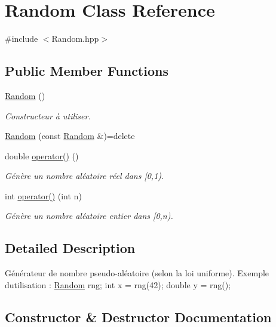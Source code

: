 \hypertarget{classRandom}{}\section{Random Class Reference}
\label{classRandom}


{\ttfamily \#include $<$Random.\+hpp$>$}

\subsection*{Public Member Functions}
\begin{DoxyCompactItemize}
\item 
\hyperlink{classRandom_acb76b49c3903a3c4fb67fd216341f08d}{Random} ()
\begin{DoxyCompactList}\small\item\em Constructeur à utiliser. \end{DoxyCompactList}\item 
\hyperlink{classRandom_a9bfadeaa4adc5ac44142d000b1c99441}{Random} (const \hyperlink{classRandom}{Random} \&)=delete
\item 
double \hyperlink{classRandom_aa0277ecffaf7d920b8ebd2399214f113}{operator()} ()
\begin{DoxyCompactList}\small\item\em Génère un nombre aléatoire réel dans \mbox{[}0,1). \end{DoxyCompactList}\item 
int \hyperlink{classRandom_a20265a86364664d85253931dc4685fa3}{operator()} (int n)
\begin{DoxyCompactList}\small\item\em Génère un nombre aléatoire entier dans \mbox{[}0,n). \end{DoxyCompactList}\end{DoxyCompactItemize}


\subsection{Detailed Description}
Générateur de nombre pseudo-\/aléatoire (selon la loi uniforme). Exemple d\textquotesingle{}utilisation \+: \hyperlink{classRandom}{Random} rng; int x = rng(42); double y = rng(); 

\subsection{Constructor \& Destructor Documentation}
